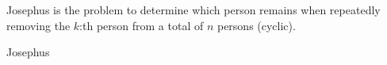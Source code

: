 

Josephus is the problem to determine which person remains when repeatedly
removing the $k$:th person from a total of $n$ persons (cyclic).

\begin{algorithm}{Josephus}
\complexity{}
\end{algorithm}